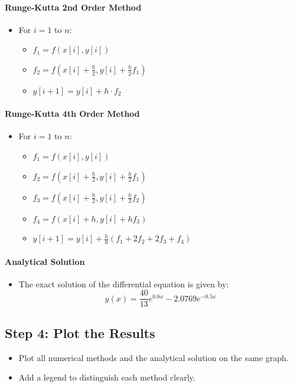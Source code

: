 \documentclass[a4paper,12pt]{article}
\begin{document}
	\paragraph{Runge-Kutta 2nd Order Method}
	\begin{itemize}
		\item For \( i = 1 \) to \( n \):
		\begin{itemize}
			\item \( f_1 = f(x[i], y[i]) \)
			\item \( f_2 = f\left(x[i] + \frac{h}{2}, y[i] + \frac{h}{2} f_1\right) \)
			\item \( y[i+1] = y[i] + h \cdot f_2 \)
		\end{itemize}
	\end{itemize}
	
	\paragraph{Runge-Kutta 4th Order Method}
	\begin{itemize}
		\item For \( i = 1 \) to \( n \):
		\begin{itemize}
			\item \( f_1 = f(x[i], y[i]) \)
			\item \( f_2 = f\left(x[i] + \frac{h}{2}, y[i] + \frac{h}{2} f_1\right) \)
			\item \( f_3 = f\left(x[i] + \frac{h}{2}, y[i] + \frac{h}{2} f_2\right) \)
			\item \( f_4 = f(x[i] + h, y[i] + h f_3) \)
			\item \( y[i+1] = y[i] + \frac{h}{6} (f_1 + 2f_2 + 2f_3 + f_4) \)
		\end{itemize}
	\end{itemize}
	
	\paragraph{Analytical Solution}
	\begin{itemize}
		\item The exact solution of the differential equation is given by:
		\[
		y(x) = \frac{40}{13} e^{0.8x} - 2.0769 e^{-0.5x}
		\]
	\end{itemize}
	
	\subsection*{Step 4: Plot the Results}
	\begin{itemize}
		\item Plot all numerical methods and the analytical solution on the same graph.
		\item Add a legend to distinguish each method clearly.
	\end{itemize}
	
\end{document}
